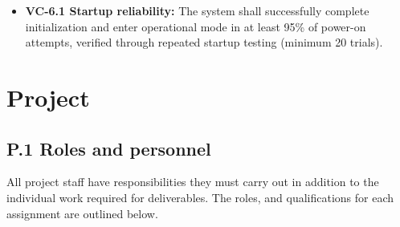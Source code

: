 \documentclass[12pt]{article}
\theoremstyle{definition}
\begin{document}
\begin{itemize}
\item \textbf{VC-6.1 Startup reliability:} The system shall successfully
complete initialization and enter operational mode in at least 95\% of power-on
attempts, verified through repeated startup testing (minimum 20 trials).
\end{itemize}



\section{Project}

\subsection{P.1 Roles and personnel}\label{item: p1}

All project staff have responsibilities they must carry out in addition to the
 individual work required for deliverables. The roles, and qualifications for
 each assignment are outlined below. 
\end{document}
